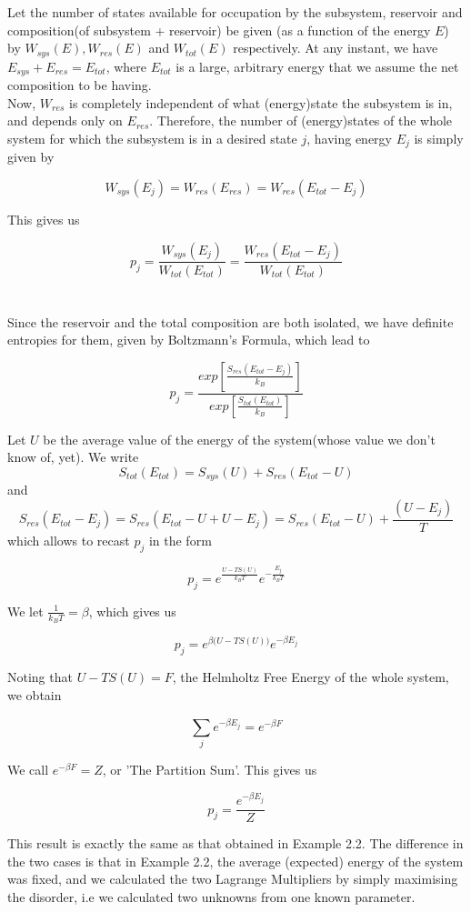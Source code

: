 \documentclass[oneside]{book}
\begin{document}
Let the number of states available for occupation by the subsystem, reservoir and composition(of subsystem + reservoir) be given (as a function of the energy $E$) by 
$W_{sys}(E), W_{res}(E)$ and $W_{tot}(E)$ respectively. At any instant, we have
 $E_{sys} + E_{res} = E_{tot}$, where $E_{tot}$ is a large, arbitrary energy that we assume the net composition to be having.\\

Now, $W_{res}$ is completely independent of what (energy)state the subsystem is in, and depends only on $E_{res}$. Therefore, the number of (energy)states of the whole system for which the subsystem is in a desired state $j$, having energy $E_j$ is simply given by

\[W_{sys}(E_j) = W_{res}(E_{res}) = W_{res}(E_{tot} - E_j) \]

 This gives us 

\[p_j =  \frac{W_{sys}(E_j)}{W_{tot}(E_{tot})} = \frac{W_{res}(E_{tot} - E_j)}{W_{tot}(E_{tot})}  \] \\ \\

Since the reservoir and the total composition are both isolated, we have definite entropies for them, given by Boltzmann's Formula, which lead to

\[p_j = \frac{  exp[\frac{S_{res}{(E_{tot} - E_j)}}{k_B}]  }{  exp[\frac{S_{tot}{(E_{tot})}}{k_B}]  } \]

Let $U$ be the average value of the energy of the system(whose value we don't know of, yet). We write 
\[  S_{tot}(E_{tot}) =   S_{sys}(U) + S_{res}(E_{tot} - U)\]
and
\[ S_{res}(E_{tot} - E_j) =  S_{res}(E_{tot} - U + U - E_j) = S_{res}(E_{tot} - U) + \frac{(U - E_j)}{T}  \]
which allows to recast $p_j$ in the form

\[p_j = e^{ \frac{U-TS(U)}{k_BT}  }   e^{    -\frac{E_j}{k_BT}   } \]

We let $\frac{1}{k_BT} = \beta$, which gives us 

\[p_j = e^{ \beta{\big(U-TS(U)\big)}  }   e^{    -\beta{E_j}   } \]

Noting that $U-TS(U) = F$, the Helmholtz Free Energy of the whole system, we obtain 

\[ \sum_{j}^{}e^{-\beta E_j} = e^{-\beta F} \]

We call $e^{-\beta F} = Z$, or 'The Partition Sum'. This gives us 

  \[ p_j = \frac{e^{-\beta E_j}}{Z}\]
  
 This result is exactly the same as that obtained in Example 2.2. The difference in the two cases is that in Example 2.2, the average (expected) energy of the system was fixed, and we calculated the two Lagrange Multipliers by simply maximising the disorder, i.e we calculated two unknowns from one known parameter. \\
 
\end{document}
